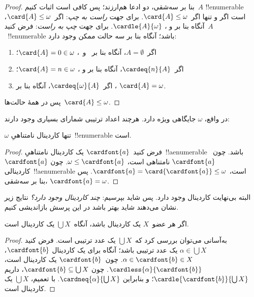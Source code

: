\documentclass[../../../include/open-logic-section]{subfiles}
\begin{document}
\begin{proof}
بنا بر سه‌شقی، دو ادعا هم‌ارزند؛ پس کافی است اثبات کنیم~$A$
!!{enumerable} است اگر و تنها اگر~$\card{A}\leq\omega$. برای جهت
\emph{راست به چپ}: اگر~$\card{A}\leq\omega$، آنگاه بنا بر
 و
، $\cardle{A}{\omega}$. برای جهت
\emph{چپ به راست}: فرض کنید~$A$~!!{enumerable} باشد؛ آنگاه بنا بر
 سه حالت ممکن وجود دارد:
\begin{enumerate}
	\item اگر~$A=\emptyset$، آنگاه بنا بر~
	و~،
	$\card{A}=0\in\omega$؛
	\item اگر~$\cardeq{n}{A}$، آنگاه بنا بر
	 و
	،
	$\card{A}=n\in\omega$؛
	\item اگر~$\cardeq{\omega}{A}$، آنگاه بنا بر
	، $\card{A}=\omega$.
\end{enumerate}
پس در همهٔ حالت‌ها~$\card{A}\leq\omega$.
\end{proof}
\noindent
در واقع، $\omega$ جایگاهی ویژه دارد. هرچند اعداد ترتیبی شمارای بسیاری
وجود دارند:

\begin{cor}
$\omega$ تنها کاردینال نامتناهیِ~!!{enumerable} است.
\end{cor}

\begin{proof}
فرض کنید~$\cardfont{a}$ یک کاردینال نامتناهیِ~!!a{enumerable} باشد.
چون~$\cardfont{a}$ نامتناهی است، $\omega\leq\cardfont{a}$. چون
$\cardfont{a}$ کاردینالی~!!a{enumerable} است،
$\cardfont{a}=\card{\cardfont{a}}\leq\omega$. پس بنا بر سه‌شقی،
$\cardfont{a}=\omega$.
\end{proof}

البته بی‌نهایت کاردینال وجود دارد. پس شاید بپرسیم: \emph{چند کاردینال
وجود دارد؟} نتایج زیر نشان می‌دهند شاید بهتر باشد در این پرسش بازاندیشی
کنیم.

\begin{prop}
اگر هر عضو~$X$ یک کاردینال باشد، آنگاه~$\bigcup X$ یک کاردینال است.
\end{prop}

\begin{proof}
به‌آسانی می‌توان بررسی کرد که~$\bigcup X$ یک عدد ترتیبی است. فرض کنید
$\alpha\in\bigcup X$ یک عدد ترتیبی باشد؛ آنگاه برای یک کاردینال
$\cardfont{b}$، $\alpha\in\cardfont{b}\in X$. چون~$\cardfont{b}$ یک
کاردینال است، $\cardless{\alpha}{\cardfont{b}}$. چون
$\cardfont{b}\subseteq\bigcup X$، داریم
$\cardle{\cardfont{b}}{\bigcup X}$؛ و بنابراین
$\cardneq{\alpha}{\bigcup X}$. با تعمیم، $\bigcup X$ یک کاردینال است.
\end{proof}
\end{document}
